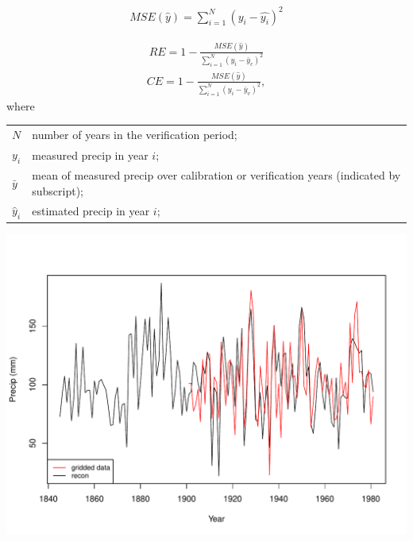 \documentclass{article}
\begin{document}
\begin{align*}
	MSE(\hat{y}) = \sum_{i=1}^{N} (y_i - \hat{y_i})^2
\end{align*}

\begin{align*}
RE = 1 - \frac{MSE(\hat{y})}{\sum_{i=1}^{N} (y_i - \bar{y}_c)^2}
\end{align*}
\begin{align*}
CE = 1 - \frac{MSE(\hat{y})}{\sum_{i=1}^{N} (y_i - \bar{y}_v)^2},
\end{align*}
where\\
\begin{center}
\begin{tabular}{ll}
$N$ & number of years in the verification period; \\
$y_i$ & measured precip in year $i$; \\
$\bar{y}$ & mean of measured precip over calibration or verification years (indicated by subscript);\\
$\hat{y}_i$ & estimated precip in year $i$; \\
\end{tabular}
\end{center}



\includegraphics[width=7in]{precipRecon.pdf}
\end{document}
